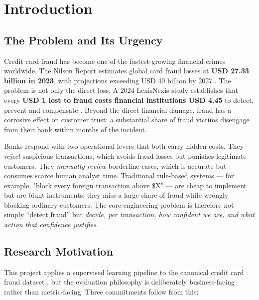 \section{Introduction}

\subsection{The Problem and Its Urgency}

Credit card fraud has become one of the fastest-growing financial crimes worldwide.
The Nilson Report estimates global card fraud losses at \textbf{USD 27.33 billion in
2023}, with projections exceeding USD 40 billion by 2027 \cite{Nilson2024}. The
problem is not only the direct loss. A 2024 LexisNexis study establishes that
every \textbf{USD 1 lost to fraud costs financial institutions USD 4.45} to detect,
prevent and compensate \cite{LexisNexis2024}. Beyond the direct financial damage,
fraud has a corrosive effect on customer trust: a substantial share of fraud
victims disengage from their bank within months of the incident.

Banks respond with two operational levers that both carry hidden costs. They
\emph{reject} suspicious transactions, which avoids fraud losses but punishes
legitimate customers. They \emph{manually review} borderline cases, which is
accurate but consumes scarce human analyst time. Traditional rule-based systems
--- for example, "block every foreign transaction above \$X" --- are cheap to
implement but are blunt instruments: they miss a large share of fraud while
wrongly blocking ordinary customers. The core engineering problem is therefore
not simply ``detect fraud'' but \emph{decide, per transaction, how confident we
are, and what action that confidence justifies}.

\subsection{Research Motivation}

This project applies a supervised learning pipeline to the canonical credit card
fraud dataset \cite{ULB2013}, but the evaluation philosophy is deliberately
business-facing rather than metric-facing. Three commitments follow from this:

